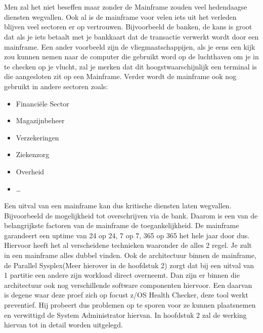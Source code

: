 
\chapter{}
\label{ch:inleiding}

Men zal het niet beseffen maar zonder de Mainframe zouden veel hedendaagse diensten wegvallen. Ook al is de mainframe voor velen iets uit het verleden blijven veel sectoren er op vertrouwen. Bijvoorbeeld de banken, de kans is groot dat als je iets betaalt met je bankkaart dat de transactie verwerkt wordt door een mainframe. Een ander voorbeeld zijn de vliegmaatschappijen, als je eens een kijk zou kunnen nemen naar de computer die gebruikt word op de luchthaven om je in te checken op je vlucht, zal je merken dat dit hoogstwaarschijnlijk een terminal is die aangesloten zit op een Mainframe. Verder wordt de mainframe ook nog gebruikt in andere sectoren zoals:


\begin{itemize}
  \item Financiële Sector
  \item Magazijnbeheer
  \item Verzekeringen
  \item Ziekenzorg
  \item Overheid
  \item \ldots
\end{itemize}

Een uitval van een mainframe kan dus kritische diensten laten wegvallen. Bijvoorbeeld de mogelijkheid tot overschrijven via de bank. Daarom is een van de belangrijkste factoren van de mainframe de toegankelijkheid. De mainframe garandeert een uptime van 24 op 24, 7 op 7, 365 op 365 het hele jaar door dus. Hiervoor heeft het al verscheidene technieken waaronder de alles 2 regel. Je zult in een mainframe alles dubbel vinden. Ook de architectuur binnen de mainframe, de Parallel Sysplex(Meer hierover in de hoofdstuk 2) zorgt dat bij een uitval van 1 partitie een andere zijn workload direct overneemt. Dan zijn er binnen die architectuur ook nog verschillende software componenten hiervoor. Een daarvan is degene waar deze proef zich op focust z/OS Health Checker, deze tool werkt preventief. Hij probeert dus problemen op te sporen voor ze kunnen plaatsnemen en verwittigd de System Administrator hiervan. In hoofdstuk 2 zal de werking hiervan tot in detail worden uitgelegd.

